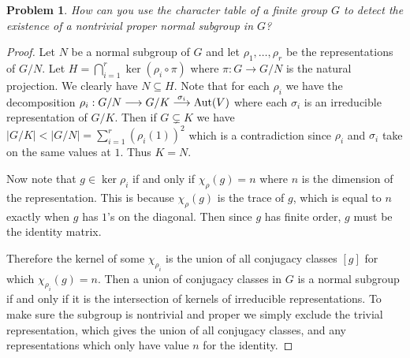 \documentclass{article}
\newtheorem{problem}{Problem}
\newcommand{\aut}{\textup{Aut}}
\begin{document}
\begin{problem}
How can you use the character table of a finite group $G$ to detect the existence of a nontrivial proper normal subgroup in $G$?
\end{problem}
\begin{proof}
Let $N$ be a normal subgroup of $G$ and let $\rho_1, \dots , \rho_r$ be the representations of $G/N$. Let $H = \bigcap_{i=1}^r \ker (\rho_i \circ \pi)$ where $\pi : G \to G/N$ is the natural projection. We clearly have $N \subseteq H$. Note that for each $\rho_i$ we have the decomposition $\rho_i : G/N \longrightarrow G/K \stackrel{\sigma_i}{\longrightarrow} \aut(V)$ where each $\sigma_i$ is an irreducible representation of $G/K$. Then if $G \subsetneq K$ we have $|G/K| < |G/N| = \sum_{i=1}^r (\rho_i(1))^2$ which is a contradiction since $\rho_i$ and $\sigma_i$ take on the same values at $1$. Thus $K = N$.

Now note that $g \in \ker \rho_i$ if and only if $\chi_{\rho}(g) = n$ where $n$ is the dimension of the representation. This is because $\chi_{\rho}(g)$ is the trace of $g$, which is equal to $n$ exactly when $g$ has $1$'s on the diagonal. Then since $g$ has finite order, $g$ must be the identity matrix.

Therefore the kernel of some $\chi_{\rho_i}$ is the union of all conjugacy classes $[g]$ for which $\chi_{\rho_i}(g) = n$. Then a union of conjugacy classes in $G$ is a normal subgroup if and only if it is the intersection of kernels of irreducible representations. To make sure the subgroup is nontrivial and proper we simply exclude the trivial representation, which gives the union of all conjugacy classes, and any representations which only have value $n$ for the identity.
\end{proof}
\end{document}
